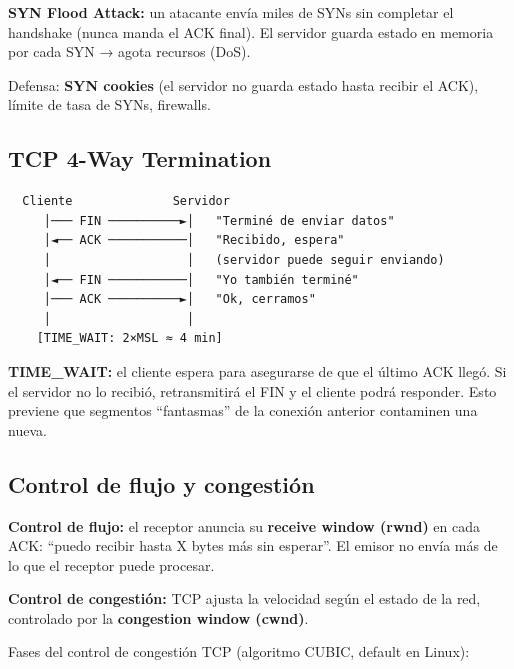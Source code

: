 \begin{cuidado}
\textbf{SYN Flood Attack:} un atacante envía miles de SYNs sin completar
el handshake (nunca manda el ACK final). El servidor guarda estado en
memoria por cada SYN → agota recursos (DoS).

Defensa: \textbf{SYN cookies} (el servidor no guarda estado hasta recibir
el ACK), límite de tasa de SYNs, firewalls.
\end{cuidado}

\subsection{TCP 4-Way Termination}

\begin{lstlisting}
  Cliente              Servidor
     │─── FIN ──────────►│   "Terminé de enviar datos"
     │◄── ACK ───────────│   "Recibido, espera"
     │                   │   (servidor puede seguir enviando)
     │◄── FIN ───────────│   "Yo también terminé"
     │─── ACK ──────────►│   "Ok, cerramos"
     │                   │
    [TIME_WAIT: 2×MSL ≈ 4 min]
\end{lstlisting}

\textbf{TIME\_WAIT:} el cliente espera para asegurarse de que el último ACK
llegó. Si el servidor no lo recibió, retransmitirá el FIN y el cliente podrá
responder. Esto previene que segmentos ``fantasmas'' de la conexión anterior
contaminen una nueva.

\subsection{Control de flujo y congestión}

\begin{concepto}
\textbf{Control de flujo:} el receptor anuncia su \textbf{receive window (rwnd)}
en cada ACK: ``puedo recibir hasta X bytes más sin esperar''. El emisor
no envía más de lo que el receptor puede procesar.

\textbf{Control de congestión:} TCP ajusta la velocidad según el estado
de la red, controlado por la \textbf{congestion window (cwnd)}.
\end{concepto}

Fases del control de congestión TCP (algoritmo CUBIC, default en Linux):

